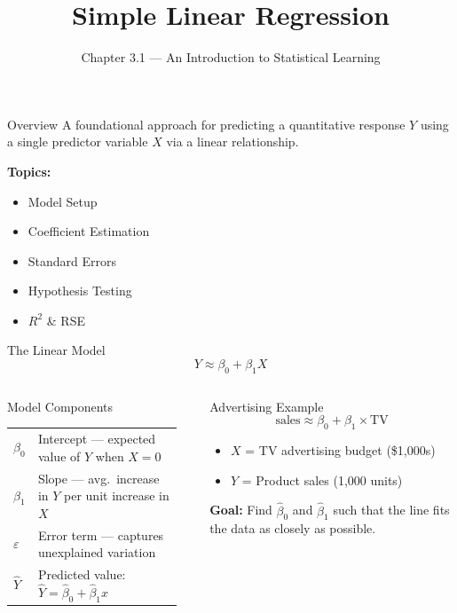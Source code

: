 \documentclass[ignorenonframetext,]{beamer}
\title{Simple Linear Regression}
\subtitle{Chapter 3.1 --- An Introduction to Statistical Learning}
\begin{document}
\frame{\titlepage}

\begin{frame}{Overview}
A foundational approach for predicting a quantitative response $Y$ using a single predictor variable $X$ via a linear relationship.

\vspace{1em}
\textbf{Topics:}
\begin{itemize}
\item Model Setup
\item Coefficient Estimation
\item Standard Errors
\item Hypothesis Testing
\item $R^2$ \& RSE
\end{itemize}
\end{frame}

\begin{frame}{The Linear Model}
$$Y \approx \beta_0 + \beta_1 X$$
\begin{columns}[T]
\begin{block}{Model Components}
\small
\begin{tabular}{@{}p{0.08\linewidth}>{\raggedright\arraybackslash}p{0.84\linewidth}@{}}
$\beta_0$ & Intercept --- expected value of $Y$ when $X=0$ \\[2pt]
$\beta_1$ & Slope --- avg.\ increase in $Y$ per unit increase in $X$ \\[2pt]
$\varepsilon$ & Error term --- captures unexplained variation \\[2pt]
$\hat{Y}$ & Predicted value: $\hat{Y} = \hat\beta_0 + \hat\beta_1 x$
\end{tabular}
\end{block}
\begin{block}{Advertising Example}
\small
$$\text{sales} \approx \beta_0 + \beta_1 \times \text{TV}$$
\begin{itemize}
\item $X$ = TV advertising budget (\$1,000s)
\item $Y$ = Product sales (1,000 units)
\end{itemize}
\textbf{Goal:} Find $\hat\beta_0$ and $\hat\beta_1$ such that the line fits the data as closely as possible.
\end{block}
\end{columns}
\end{frame}
\end{document}
